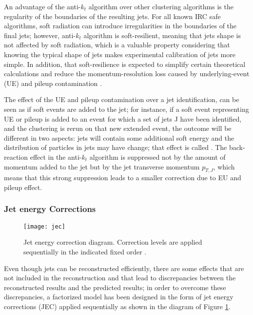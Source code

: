 An advantage of the anti-$k_t$ algorithm over other clustering algorithms is the regularity of the boundaries of the resulting jets. For all known IRC safe algorithms, soft radiation can introduce irregularities in the boundaries of the final jets; however, anti-$k_t$ algorithm is soft-resilient, meaning that jets shape is not affected by soft radiation, which is a valuable property considering that knowing the typical shape of jets makes experimental calibration of jets more simple. In addition, that soft-resilience is expected to simplify certain theoretical calculations and reduce the momentum-resolution loss caused by underlying-event (UE) and pileup contamination \cite{antikt}.  

The effect of the UE and pileup contamination over a jet identification, can be seen as if soft events are added to the jet; for instance, if a soft event representing UE or pileup is added to an event for which a set of jets J have been identified, and the clustering is rerun on that new extended event, the outcome will be different in two aspects: jets will contain some additional soft energy and the distribution of particles in jets may have change; that effect is called . The back-reaction effect in the anti-$k_t$ algorithm is suppressed not by the amount of momentum added to the jet but by the jet transverse momentum $p_{T,J}$, which means that this strong suppression leads to a smaller correction due to EU and pileup effect\cite{antikt}.               


\subsubsection*{Jet energy Corrections}

\begin{figure}[!h]
  \centering
  \texttt{[image: jec]}
  \caption[Jet energy corrections.]{Jet energy correction diagram. Correction levels are applied sequentially in the indicated fixed order \cite{jec2}.}\label{fig:jec}
\end{figure}

Even though jets can be reconstructed efficiently, there are some effects that are not included in the reconstruction and that lead to discrepancies between the reconstructed results and the predicted results; in order to overcome these discrepancies, a factorized model has been designed in the form of jet energy corrections (JEC) \cite{jec,jec2} applied  sequentially as shown in the diagram of Figure \ref{fig:jec}.

